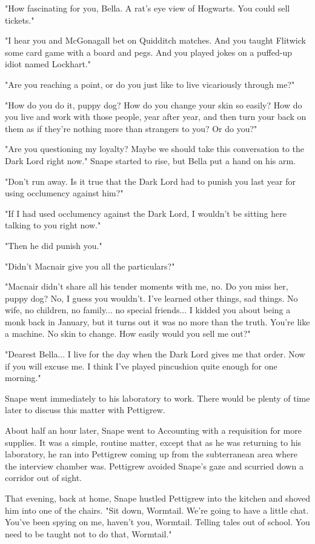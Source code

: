 \documentclass[a4paper,11pt]{article}
\begin{document}
"How fascinating for you, Bella. A rat's eye view of Hogwarts. You could sell tickets."

"I hear you and McGonagall bet on Quidditch matches. And you taught Flitwick some card game with a board and pegs. And you played jokes on a puffed-up idiot named Lockhart."

"Are you reaching a point, or do you just like to live vicariously through me?"

"How do you do it, puppy dog? How do you change your skin so easily? How do you live and work with those people, year after year, and then turn your back on them as if they're nothing more than strangers to you? Or do you?"

"Are you questioning my loyalty? Maybe we should take this conversation to the Dark Lord right now." Snape started to rise, but Bella put a hand on his arm.

"Don't run away. Is it true that the Dark Lord had to punish you last year for using occlumency against him?"

"If I had used occlumency against the Dark Lord, I wouldn't be sitting here talking to you right now."

"Then he did punish you."

"Didn't Macnair give you all the particulars?"

"Macnair didn't share all his tender moments with me, no. Do you miss her, puppy dog? No, I guess you wouldn't. I've learned other things, sad things. No wife, no children, no family... no special friends... I kidded you about being a monk back in January, but it turns out it was no more than the truth. You're like a machine. No skin to change. How easily would you sell me out?"

"Dearest Bella... I live for the day when the Dark Lord gives me that order. Now if you will excuse me. I think I've played pincushion quite enough for one morning."

Snape went immediately to his laboratory to work. There would be plenty of time later to discuss this matter with Pettigrew.

About half an hour later, Snape went to Accounting with a requisition for more supplies. It was a simple, routine matter, except that as he was returning to his laboratory, he ran into Pettigrew coming up from the subterranean area where the interview chamber was. Pettigrew avoided Snape's gaze and scurried down a corridor out of sight.

That evening, back at home, Snape hustled Pettigrew into the kitchen and shoved him into one of the chairs. "Sit down, Wormtail. We're going to have a little chat. You've been spying on me, haven't you, Wormtail. Telling tales out of school. You need to be taught not to do that, Wormtail."
\end{document}
